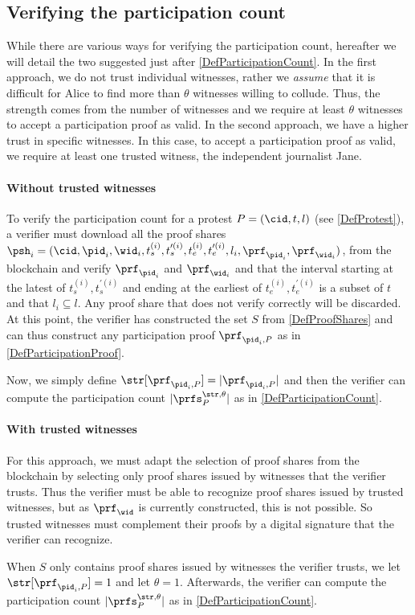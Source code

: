 \subsection{Verifying the participation count}
\label{ProtocolVerification}

While there are various ways for verifying the participation count, hereafter we will detail the two suggested just after \cref{DefParticipationCount}.
In the first approach, we do not trust individual witnesses, rather we \emph{assume} that it is difficult for Alice to find more than \(\theta\) witnesses willing to collude.
Thus, the strength comes from the number of witnesses and we require at least \(\theta\) witnesses to accept a participation proof as valid.
In the second approach, we have a higher trust in specific witnesses.
In this case, to accept a participation proof as valid, we require at least one trusted witness, the independent journalist Jane.

\paragraph{Without trusted witnesses}

To verify the participation count for a protest \(P = (\cid, t, l)\) (see \cref{DefProtest}), a verifier must download all the proof shares \(\psh_i =   (\cid, \pid_i, \wid_i, t_s^{(i)}, t_s^{\prime (i)}, t_e^{(i)}, t_e^{\prime   (i)}, l_i, \prf_{\pid_i}, \prf_{\wid_i})\), from the blockchain and verify \(\prf_{\pid_i}\) and \(\prf_{\wid_i}\) and that the interval starting at the latest of \(t_s^{(i)}, t_s^{\prime (i)}\) and ending at the earliest of \(t_e^{(i)}, t_e^{\prime (i)}\) is a subset of \(t\) and that \(l_i\subseteq  l\).
Any proof share that does not verify correctly will be discarded.
At this point, the verifier has constructed the set \(S\) from \cref{DefProofShares} and can thus construct any participation proof \(\prf_{\pid_i, P}\) as in \cref{DefParticipationProof}.

Now, we simply define \(\str[\prf_{\pid_i, P}] = |\prf_{\pid_i, P}|\) and then the verifier can compute the participation count \(|\prfs_P^{\str, \theta}|\) as in \cref{DefParticipationCount}.

\paragraph{With trusted witnesses}

For this approach, we must adapt the selection of proof shares from the blockchain by selecting only proof shares issued by witnesses that the verifier trusts.
Thus the verifier must be able to recognize proof shares issued by trusted witnesses, but as \(\prf_\wid\) is currently constructed, this is not possible.
So trusted witnesses must complement their proofs by a digital signature that the verifier can recognize.

When \(S\) only contains proof shares issued by witnesses the verifier trusts, we let \(\str[\prf_{\pid_i, P}] = 1\) and let \(\theta = 1\).
Afterwards, the verifier can compute the participation count \(|\prfs_P^{\str, \theta}|\) as in \cref{DefParticipationCount}.
